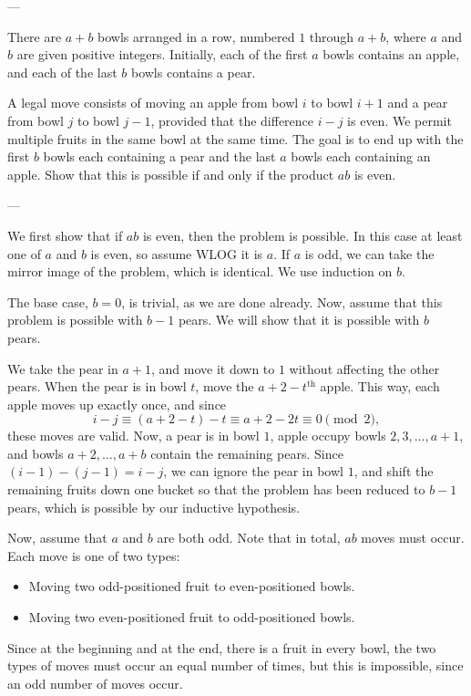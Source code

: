 
---

There are $a+b$ bowls arranged in a row, numbered $1$ through $a+b$, where $a$ and $b$ are given positive integers. Initially, each of the first $a$ bowls contains an apple, and each of the last $b$ bowls contains a pear.

A legal move consists of moving an apple from bowl $i$ to bowl $i+1$ and a pear from bowl $j$ to bowl $j-1$, provided that the difference $i-j$ is even. We permit multiple fruits in the same bowl at the same time. The goal is to end up with the first $b$ bowls each containing a pear and the last $a$ bowls each containing an apple. Show that this is possible if and only if the product $ab$ is even.

---

We first show that if $ab$ is even, then the problem is possible. In this case at least one of $a$ and $b$ is even, so assume WLOG it is $a$. If $a$ is odd, we can take the mirror image of the problem, which is identical. We use induction on $b$.

The base case, $b=0$, is trivial, as we are done already. Now, assume that this problem is possible with $b-1$ pears. We will show that it is possible with $b$ pears.

We take the pear in $a+1$, and move it down to $1$ without affecting the other pears. When the pear is in bowl $t$, move the $a+2-t^\text{th}$ apple. This way, each apple moves up exactly once, and since $$i-j\equiv (a+2-t)-t\equiv a+2-2t\equiv 0\pmod2,$$
these moves are valid. Now, a pear is in bowl $1$, apple occupy bowls $2,3,\ldots,a+1$, and bowls $a+2,\ldots,a+b$ contain the remaining pears. Since $(i-1)-(j-1)=i-j$, we can ignore the pear in bowl $1$, and shift the remaining fruits down one bucket so that the problem has been reduced to $b-1$ pears, which is possible by our inductive hypothesis.

Now, assume that $a$ and $b$ are both odd. Note that in total, $ab$ moves must occur. Each move is one of two types:
\begin{itemize}[itemsep=0em]
    \item Moving two odd-positioned fruit to even-positioned bowls.
    \item Moving two even-positioned fruit to odd-positioned bowls.
\end{itemize}
Since at the beginning and at the end, there is a fruit in every bowl, the two types of moves must occur an equal number of times, but this is impossible, since an odd number of moves occur.


